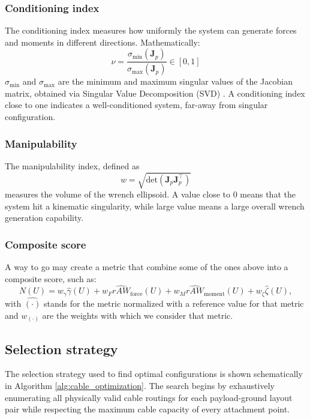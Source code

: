 \subsubsection{Conditioning index}
The conditioning index measures how uniformly the system can generate forces and moments in different directions. Mathematically:
\begin{equation}
    \nu = \frac{\sigma_{\min}(\mathbf{J}_p)}{\sigma_{\max}(\mathbf{J}_p)} \in [0, 1]
    \label{eq:conditioning_index}
\end{equation}
$\sigma_{\min}$ and $\sigma_{\max}$ are the minimum and maximum singular values of the Jacobian matrix, obtained via Singular Value Decomposition (SVD) \cite{erskine_dynamic_2021}. A conditioning index close to one indicates a well-conditioned system, far-away from singular configuration.


\subsubsection{Manipulability}
The manipulability index, defined as 
\begin{equation}
    w = \sqrt{\text{det}(\mathbf{J}_p\mathbf{J}_p^\top)}
    \label{eq:manipulability}
\end{equation}
measures the volume of the wrench ellipsoid. A value close to 0 means that the system hit a kinematic singularity, while large value means a large overall wrench generation capability.

\subsubsection{Composite score}
A way to go may create a metric that combine some of the ones above into a composite score, such as:
\begin{equation}
    N(U)
    =
    w_\gamma \hat{\gamma}(U)
    +
    w_F \widehat{rAW}_{\mathrm{force}}(U)
    +
    w_M \widehat{rAW}_{\mathrm{moment}}(U)
    +
    w_\zeta \hat{\zeta}(U),
\end{equation}
with $\widehat{(\cdot)}$ stands for the metric normalized with a reference value for that metric and $w_{(\cdot)}$ are the weights with which we consider that metric.


\subsection{Selection strategy}
\label{sec:selection_strategy}

The selection strategy used to find optimal configurations is shown schematically in Algorithm \ref{alg:cable_optimization}. The search begins by exhaustively enumerating all physically valid cable routings for each payload-ground layout pair while respecting the maximum cable capacity of every attachment point. 

